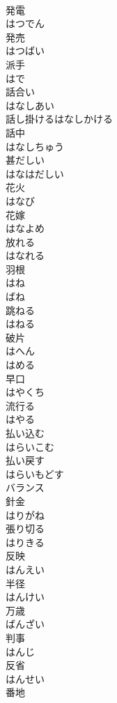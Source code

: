\documentclass[8pt]{extreport}
\begin{document}
\begin{CJK}{UTF8}{min}
\\	発電 
\\	はつでん	
\\	発売 
\\	はつばい	
\\	派手 
\\	はで	
\\	話合い 
\\	はなしあい	
\\	話し掛けるはなしかける	
\\	話中 
\\	はなしちゅう	
\\	甚だしい 
\\	はなはだしい	
\\	花火 
\\	はなび	
\\	花嫁 
\\	はなよめ	
\\	放れる 
\\	はなれる	
\\	羽根 
\\	はね	
\\	ばね	
\\	跳ねる 
\\	はねる	
\\	破片 
\\	はへん	
\\	はめる	
\\	早口 
\\	はやくち	
\\	流行る 
\\	はやる	
\\	払い込む 
\\	はらいこむ	
\\	払い戻す 
\\	はらいもどす	
\\	バランス	
\\	針金 
\\	はりがね	
\\	張り切る 
\\	はりきる	
\\	反映 
\\	はんえい	
\\	半径 
\\	はんけい	
\\	万歳 
\\	ばんざい	
\\	判事 
\\	はんじ	
\\	反省 
\\	はんせい	
\\	番地 

\end{CJK}
\end{document}
